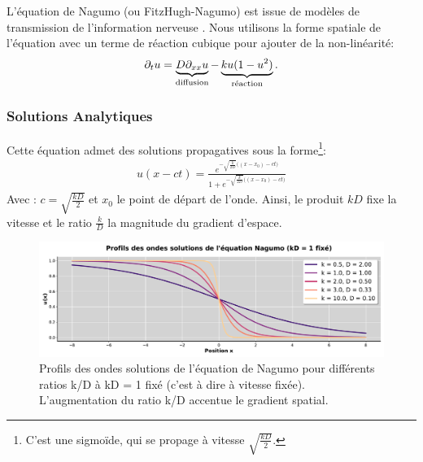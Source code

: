 L'équation de Nagumo (ou FitzHugh-Nagumo) est issue de modèles de transmission de l'information nerveuse \cite{FITZHUGH1961445}.
Nous utilisons la forme spatiale de l'équation \cite{keener1998mathematical} avec un terme de réaction cubique pour ajouter de la non-linéarité:
\begin{align}
    \partial_t u = \underbrace{D \partial_{xx} u}_{\text{diffusion}}
            - \underbrace{ku(1-u^2)}_{\text{réaction}}.
\end{align}
\subsubsection{Solutions Analytiques}
Cette équation admet des solutions propagatives sous la forme\footnote{C'est une sigmoïde, qui se propage à vitesse $\sqrt{\frac{kD}{2}}$.}:%
\begin{align}
    \label{eq:sol_nagumo}
 u(x-ct) = \frac{e^{
 -\sqrt{\frac{k}{2D}} \bigl((x-x_0) - ct \bigr)}
 }
 {1 + e^{
 -\sqrt{\frac{k}{2D}} \bigl((x-x_0) - ct \bigr)}
 }
\end{align}
Avec : $c = \sqrt{\frac{kD}{2}}$ et $x_0$ le point de départ de l'onde.
Ainsi, le produit $kD$ fixe la vitesse et le ratio $\frac{k}{D}$ la magnitude du gradient d'espace.

\begin{figure}[htbp]
    \centering
    \includegraphics[width=\textwidth]{media/4_travail/2_nagumo/profils_nagumo.pdf}
    \caption{Profils des ondes solutions de l'équation de Nagumo pour différents ratios k/D à kD = 1 fixé (c'est à dire à vitesse fixée). L'augmentation du ratio k/D accentue le gradient spatial.}
    \label{fig:profils_nagumo}
\end{figure}

